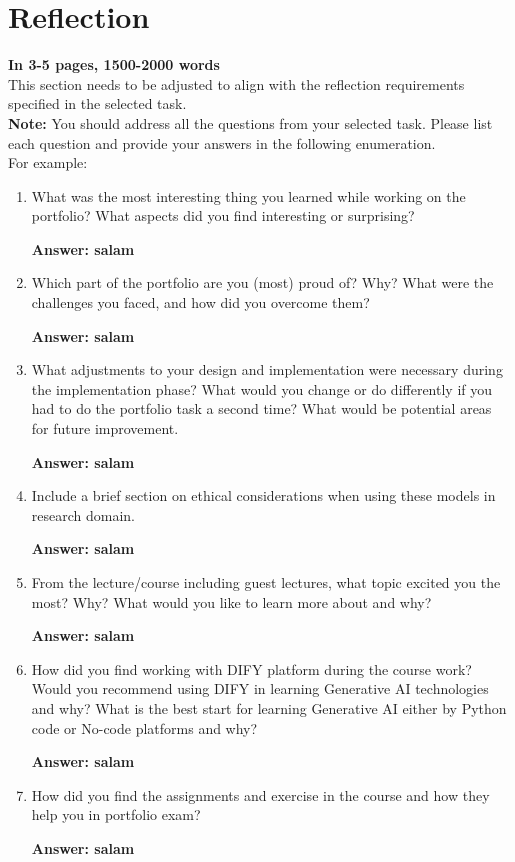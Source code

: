 \section{Reflection}
\label{sec:reflection}

\textbf{In 3-5 pages, 1500-2000 words}\\

This section needs to be adjusted to align with the reflection requirements specified in the selected task.\\

\textbf{Note:} You should address all the questions from your selected task. Please list each question and provide your answers in the following enumeration.\\

For example:
\begin{enumerate}
    \item What was the most interesting thing you learned while working on the portfolio? What aspects did you find interesting or surprising? 
    
     \textbf{Answer: salam}

     \item Which part of the portfolio are you (most) proud of? Why? What were the challenges you faced, and how did you overcome them? 
    
     \textbf{Answer: salam}

     \item What adjustments to your design and implementation were necessary during the implementation phase? What would you change or do differently if you had to do the portfolio task a second time? What would be potential areas for future improvement. 
    
     \textbf{Answer: salam}

     \item Include a brief section on ethical considerations when using these models in research domain.
    
     \textbf{Answer: salam}

     \item From the lecture/course including guest lectures, what topic excited you the most? Why? What would you like to learn more about and why? 
    
     \textbf{Answer: salam}

     \item  How did you find working with DIFY platform during the course work? Would you recommend using DIFY in learning Generative AI technologies and why? What is the best start for learning Generative AI either by Python code or No-code platforms and why? 
    
     \textbf{Answer: salam}

     \item How did you find the assignments and exercise in the course and how they help you in portfolio exam? 
    
     \textbf{Answer: salam}

    
\end{enumerate}




 

 

